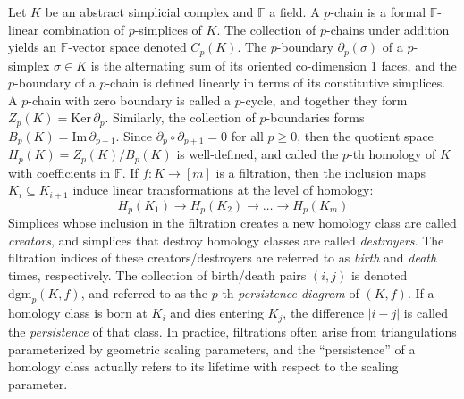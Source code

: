 \documentclass[sn-mathphys]{sn-jnl}
\begin{document}
Let $K$ be an abstract simplicial complex and $\mathbb{F}$ a field.
A $p$-chain is a
formal $\mathbb{F}$-linear combination  of $p$-simplices of $K$. The collection of $p$-chains under addition yields an 
$\mathbb{F}$-vector space  denoted   $C_p(K)$. 
The $p$-boundary $\partial_p(\sigma)$  of a $p$-simplex $\sigma\in K$ is the alternating sum of its oriented co-dimension 1 faces,
and the $p$-boundary of a $p$-chain is defined 
linearly in terms of its constitutive simplices. 
A $p$-chain with zero boundary is called a $p$-cycle, and together they form $Z_p(K) = \mathrm{Ker}\,\partial_p$. 
Similarly, the collection of $p$-boundaries forms  $B_p(K) = \mathrm{Im}\,\partial_{p+1}$.
Since $\partial_p \circ \partial_{p+1} = 0$ for all $p\geq 0$, 
then the quotient space $H_p(K) = Z_p(K) / B_{p}(K)$ is well-defined, and called the 
$p$-th homology of $K$ with coefficients in $\mathbb{F}$. 
If $ f: K \rightarrow  [m]$ is a filtration, then the inclusion maps  $K_i\subseteq K_{i+1}$   induce linear transformations 
at the level of homology:
\begin{equation}
	H_p(K_1) \to H_p(K_2) \to \dots \to H_p(K_m)
\end{equation}
Simplices whose inclusion in the filtration creates a new homology class are   called \emph{creators}, and simplices that destroy homology classes are   called \emph{destroyers}. 
The filtration indices of 
these creators/destroyers are referred to as \emph{birth} and \emph{death} times, respectively. 
The collection of birth/death  pairs 
$(i,j)$ is denoted $\mathrm{dgm}_p(K ,f )$, 
and referred to as the $p$-th \emph{persistence diagram} of $(K,f)$.
If a homology class is born at   $K_i$ and dies entering   $K_j$, the difference $\lvert i - j \rvert$ is called the \emph{persistence} of that class.
In practice, filtrations often arise from triangulations parameterized by geometric scaling parameters, and the ``persistence'' of a homology class actually refers to its lifetime with respect to the scaling parameter. 
\end{document}
